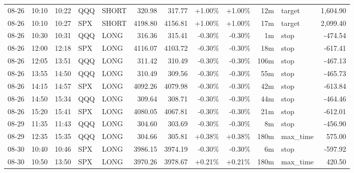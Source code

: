 \documentclass[11pt,a4paper,twoside]{article}
\begin{document}
\begin{center}
\begin{longtable}{>{\color{txtmain}}l l l l l r r r r r >{\color{txtmain}}l r}
08-26 & 10:10 & 10:22 & QQQ & SHORT & 320.98 & 317.77 & \textcolor{wingreen}{+1.00\%} & \textcolor{wingreen}{+1.00\%} & 12m & target & \textcolor{wingreen}{1,604.90} \\
08-26 & 10:10 & 10:27 & SPX & SHORT & 4198.80 & 4156.81 & \textcolor{wingreen}{+1.00\%} & \textcolor{wingreen}{+1.00\%} & 17m & target & \textcolor{wingreen}{2,099.40} \\
08-26 & 10:30 & 10:31 & QQQ & LONG & 316.36 & 315.41 & \textcolor{lossred}{-0.30\%} & \textcolor{lossred}{-0.30\%} & 1m & stop & \textcolor{lossred}{-474.54} \\
08-26 & 12:00 & 12:18 & SPX & LONG & 4116.07 & 4103.72 & \textcolor{lossred}{-0.30\%} & \textcolor{lossred}{-0.30\%} & 18m & stop & \textcolor{lossred}{-617.41} \\
08-26 & 12:05 & 13:51 & QQQ & LONG & 311.42 & 310.49 & \textcolor{lossred}{-0.30\%} & \textcolor{lossred}{-0.30\%} & 106m & stop & \textcolor{lossred}{-467.13} \\
08-26 & 13:55 & 14:50 & QQQ & LONG & 310.49 & 309.56 & \textcolor{lossred}{-0.30\%} & \textcolor{lossred}{-0.30\%} & 55m & stop & \textcolor{lossred}{-465.73} \\
08-26 & 14:15 & 14:57 & SPX & LONG & 4092.26 & 4079.98 & \textcolor{lossred}{-0.30\%} & \textcolor{lossred}{-0.30\%} & 42m & stop & \textcolor{lossred}{-613.84} \\
08-26 & 14:50 & 15:34 & QQQ & LONG & 309.64 & 308.71 & \textcolor{lossred}{-0.30\%} & \textcolor{lossred}{-0.30\%} & 44m & stop & \textcolor{lossred}{-464.46} \\
08-26 & 15:20 & 15:41 & SPX & LONG & 4080.05 & 4067.81 & \textcolor{lossred}{-0.30\%} & \textcolor{lossred}{-0.30\%} & 21m & stop & \textcolor{lossred}{-612.01} \\
08-29 & 11:35 & 11:43 & QQQ & LONG & 304.60 & 303.69 & \textcolor{lossred}{-0.30\%} & \textcolor{lossred}{-0.30\%} & 8m & stop & \textcolor{lossred}{-456.90} \\
08-29 & 12:35 & 15:35 & QQQ & LONG & 304.66 & 305.81 & \textcolor{wingreen}{+0.38\%} & \textcolor{wingreen}{+0.38\%} & 180m & max\_time & \textcolor{wingreen}{575.00} \\
08-30 & 10:40 & 10:46 & SPX & LONG & 3986.15 & 3974.19 & \textcolor{lossred}{-0.30\%} & \textcolor{lossred}{-0.30\%} & 6m & stop & \textcolor{lossred}{-597.92} \\
08-30 & 10:50 & 13:50 & SPX & LONG & 3970.26 & 3978.67 & \textcolor{wingreen}{+0.21\%} & \textcolor{wingreen}{+0.21\%} & 180m & max\_time & \textcolor{wingreen}{420.50} \\

\end{longtable}
\end{center}
\end{document}

